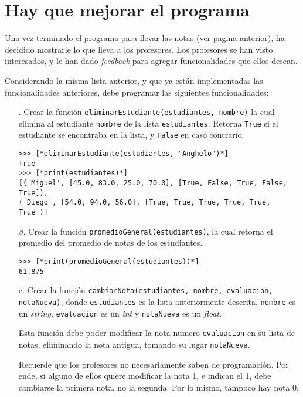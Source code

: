 \section{Hay que mejorar el programa}

Una vez terminado el programa para llevar las notas (ver pagina anterior), ha decidido mostrarle lo que lleva a los profesores. Los profesores se han visto interesados, y le han dado \textit{feedback} para agregar funcionalidades que ellos desean.

Considerando la misma lista anterior, y que ya están implementadas las funcionalidades anteriores, debe programar las siguientes funcionalidades:

\begin{enumerate}
	\item[\textbullet.] Crear la función \texttt{eliminarEstudiante(estudiantes, nombre)} la cual elimina al estudiante \texttt{nombre} de la lista \texttt{estudiantes}. Retorna \texttt{True} si el estudiante se encontraba en la lista, y \texttt{False} en caso contrario.

\begin{lstlisting}[style=consola]
>>> [*eliminarEstudiante(estudiantes, "Anghelo")*]
True
>>> [*print(estudiantes)*]
[('Miguel', [45.0, 83.0, 25.0, 70.0], [True, False, True, False, True]), 
('Diego', [54.0, 94.0, 56.0], [True, True, True, True, True, True])]
\end{lstlisting}

    \item[$\beta$. ] Crear la función \texttt{promedioGeneral(estudiantes)}, la cual retorna el promedio del promedio de notas de los estudiantes.

\begin{lstlisting}[style=consola]
>>> [*print(promedioGeneral(estudiantes))*]
61.875
\end{lstlisting}

    \item[c.] Crear la función \texttt{cambiarNota(estudiantes, nombre, evaluacion, notaNueva)}, donde \texttt{estudiantes} es la lista anteriormente descrita, \texttt{nombre} es un \textit{string}, \texttt{evaluacion} es un \textit{int} y \texttt{notaNueva} es un \textit{float}. 

    Esta función debe poder modificar la nota numero \texttt{evaluacion} en su lista de notas, eliminando la nota antigua, tomando su lugar \texttt{notaNueva}. 

    Recuerde que los profesores no necesariamente saben de programación. Por ende, si alguno de ellos quiere modificar la nota 1, e indican el 1, debe cambiarse la primera nota, no la segunda. Por lo mismo, tampoco hay nota 0.


\end{enumerate}
